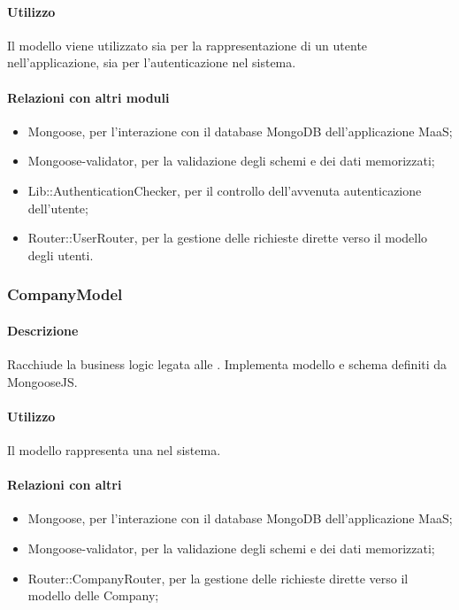 \paragraph*{Utilizzo}
Il modello viene utilizzato sia per la rappresentazione di un utente nell'applicazione, sia per l'autenticazione nel sistema.

\paragraph*{Relazioni con altri moduli}
\begin{itemize}
\item Mongoose, per l'interazione con il database MongoDB dell'applicazione MaaS;
\item Mongoose-validator, per la validazione degli schemi e dei dati memorizzati;
\item Lib::AuthenticationChecker, per il controllo dell'avvenuta autenticazione dell'utente;
\item Router::UserRouter, per la gestione delle richieste dirette verso il modello degli utenti.
\end{itemize}

\subsubsection{CompanyModel}
\paragraph*{Descrizione}
Racchiude la business logic legata alle . Implementa modello e schema definiti da MongooseJS.

\paragraph*{Utilizzo}
Il modello rappresenta una  nel sistema.

\paragraph*{Relazioni con altri }
\begin{itemize}
\item Mongoose, per l'interazione con il database MongoDB dell'applicazione MaaS;
\item Mongoose-validator, per la validazione degli schemi e dei dati memorizzati;
\item Router::CompanyRouter, per la gestione delle richieste dirette verso il modello delle Company;
\end{itemize}

